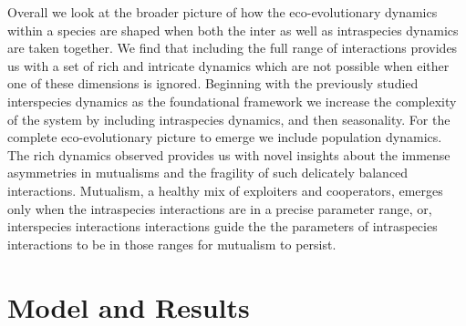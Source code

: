 \documentclass[12pt]{article}
\newcommand{\cha}[1]{\textcolor{darkblue}{(#1)}}
\begin{document}



Overall we look at the broader picture of how the eco-evolutionary dynamics within a species are shaped when both the inter as well as intraspecies dynamics are taken together. 
We find that including the full range of interactions provides us with a set of rich and intricate dynamics which are not possible when either one of these dimensions is ignored.
Beginning with the previously studied interspecies dynamics as the foundational framework \citep{gokhale:PRSB:2012} we increase the complexity of the system by including intraspecies dynamics, and then seasonality.
For the complete eco-evolutionary picture to emerge we include population dynamics.
The rich dynamics observed provides us with novel insights about the immense asymmetries in mutualisms and the fragility of such delicately balanced interactions.
Mutualism, a healthy mix of exploiters and cooperators, emerges only when the intraspecies interactions are in a precise parameter range, or, interspecies interactions interactions guide the the parameters of intraspecies interactions to be in those ranges for mutualism to persist.


\section{Model and Results}
\end{document}
